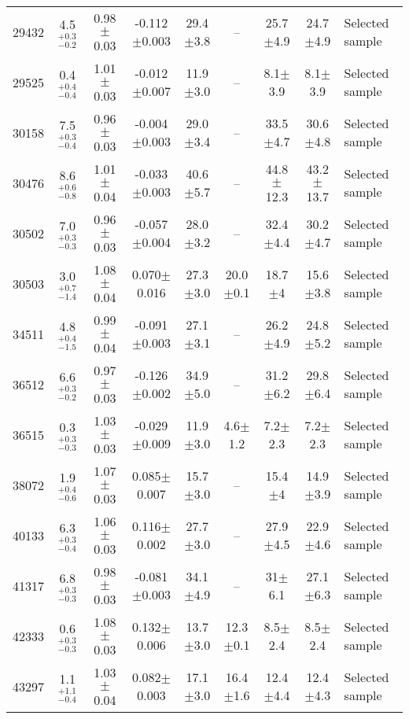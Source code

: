 \begin{table*}
\begin{tabular}{lcccccccl}
29432 &   4.5$_{-0.2}^{+0.3}$   &   0.98$\pm$0.03   &   -0.112$\pm$0.003   &   29.4$\pm$3.8   &   --   & 25.7$\pm$4.9 & 24.7$\pm$4.9 &   Selected sample \\ 
29525 &   0.4$_{-0.4}^{+0.4}$   &   1.01$\pm$0.03   &   -0.012$\pm$0.007   &   11.9$\pm$3.0   &   --   & 8.1$\pm$3.9 & 8.1$\pm$3.9 &   Selected sample \\ 
30158 &   7.5$_{-0.4}^{+0.3}$   &   0.96$\pm$0.03   &   -0.004$\pm$0.003   &   29.0$\pm$3.4   &   --   & 33.5$\pm$4.7 & 30.6$\pm$4.8 &   Selected sample \\ 
30476 &   8.6$_{-0.8}^{+0.6}$   &   1.01$\pm$0.04   &   -0.033$\pm$0.003   &   40.6$\pm$5.7   &   --   & 44.8$\pm$12.3 & 43.2$\pm$13.7 &   Selected sample \\ 
30502 &   7.0$_{-0.3}^{+0.3}$   &   0.96$\pm$0.03   &   -0.057$\pm$0.004   &   28.0$\pm$3.2   &   --   & 32.4$\pm$4.4 & 30.2$\pm$4.7 &   Selected sample \\ 
30503 &   3.0$_{-1.4}^{+0.7}$   &   1.08$\pm$0.04   &   0.070$\pm$0.016   &   27.3$\pm$3.0   &   20.0$\pm$0.1   & 18.7$\pm$4 & 15.6$\pm$3.8 &   Selected sample \\ 
34511 &   4.8$_{-1.5}^{+0.4}$   &   0.99$\pm$0.04   &   -0.091$\pm$0.003   &   27.1$\pm$3.1   &   --   & 26.2$\pm$4.9 & 24.8$\pm$5.2 &   Selected sample \\ 
36512 &   6.6$_{-0.2}^{+0.3}$   &   0.97$\pm$0.03   &   -0.126$\pm$0.002   &   34.9$\pm$5.0   &   --   & 31.2$\pm$6.2 & 29.8$\pm$6.4 &   Selected sample \\ 
36515 &   0.3$_{-0.3}^{+0.3}$   &   1.03$\pm$0.03   &   -0.029$\pm$0.009   &   11.9$\pm$3.0   &   4.6$\pm$1.2   & 7.2$\pm$2.3 & 7.2$\pm$2.3 &   Selected sample \\ 
38072 &   1.9$_{-0.6}^{+0.4}$   &   1.07$\pm$0.03   &   0.085$\pm$0.007   &   15.7$\pm$3.0   &   --   & 15.4$\pm$4 & 14.9$\pm$3.9 &   Selected sample \\ 
40133 &   6.3$_{-0.4}^{+0.3}$   &   1.06$\pm$0.03   &   0.116$\pm$0.002   &   27.7$\pm$3.0   &   --   & 27.9$\pm$4.5 & 22.9$\pm$4.6 &   Selected sample \\ 
41317 &   6.8$_{-0.3}^{+0.3}$   &   0.98$\pm$0.03   &   -0.081$\pm$0.003   &   34.1$\pm$4.9   &   --   & 31$\pm$6.1 & 27.1$\pm$6.3 &   Selected sample \\ 
42333 &   0.6$_{-0.3}^{+0.3}$   &   1.08$\pm$0.03   &   0.132$\pm$0.006   &   13.7$\pm$3.0   &   12.3$\pm$0.1   & 8.5$\pm$2.4 & 8.5$\pm$2.4 &   Selected sample \\ 
43297 &   1.1$_{-0.4}^{+1.1}$   &   1.03$\pm$0.04   &   0.082$\pm$0.003   &   17.1$\pm$3.0   &   16.4$\pm$1.6   & 12.4$\pm$4.4 & 12.4$\pm$4.3 &   Selected sample \\ 

\end{tabular}
\end{table*}
